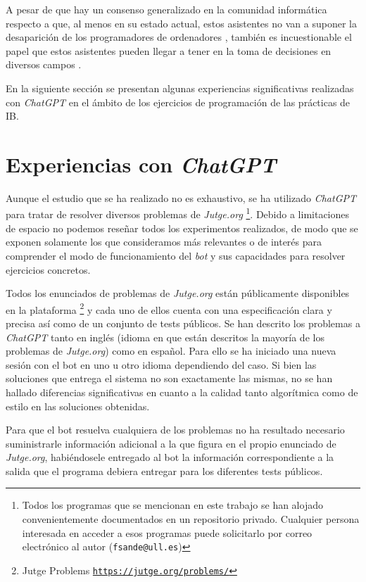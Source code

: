 \documentclass[twocolumn,twoside,a4paper, 10pt]{article}
\newcommand{\jutge}{\textit{Jutge.org}{}}           %
\newcommand{\ChatGPT}{\textit{ChatGPT}{}}           %
\begin{document}
A pesar de que hay un consenso generalizado en la comunidad informática respecto a que, al menos en su estado
actual, estos asistentes no van a suponer la desaparición de los programadores de ordenadores
\cite{Castelvecchi:2022:ACaA}, 
también es incuestionable el papel que estos asistentes pueden llegar a tener en la toma de decisiones en
diversos campos 
\cite{Kung:2022:PCU}.


En la siguiente sección se presentan algunas experiencias significativas realizadas con \ChatGPT{} en el ámbito
de los ejercicios de programación de las prácticas de IB.
\section{Experiencias con \ChatGPT{}}
Aunque el estudio que se ha realizado no es exhaustivo, se ha utilizado \ChatGPT{} para tratar de resolver
diversos problemas de \jutge{}
\footnote{
Todos los programas que se mencionan en este trabajo se han alojado convenientemente documentados en un repositorio privado.
Cualquier persona interesada en acceder a esos programas puede solicitarlo por correo electrónico al autor 
(\texttt{fsande@ull.es})
}. 
Debido a limitaciones de espacio no podemos reseñar todos los experimentos realizados, de modo que 
se exponen solamente los que consideramos más relevantes o de interés para comprender el modo de funcionamiento 
del \textit{bot} y sus capacidades para resolver ejercicios concretos.

Todos los enunciados de problemas de \jutge{} están públicamente disponibles en la plataforma 
\footnote{Jutge Problems \href{https://jutge.org/problems/}{\scriptsize{\texttt{https://jutge.org/problems/}}}}
y cada uno de ellos cuenta con una especificación clara y precisa así como de un conjunto de tests públicos.
Se han descrito los problemas a \ChatGPT{} tanto en inglés (idioma en que están descritos la mayoría de
los problemas de \jutge{}) como en español.
Para ello se ha iniciado una nueva sesión con el bot en uno u otro idioma dependiendo del caso.
Si bien las soluciones que entrega el sistema no son exactamente las mismas, no se han hallado diferencias
significativas en cuanto a la calidad tanto algorítmica como de estilo en las soluciones obtenidas.

Para que el bot resuelva cualquiera de los problemas no ha resultado necesario suministrarle información
adicional a la que figura en el propio enunciado de \jutge{}, habiéndosele entregado al bot la información
correspondiente a la salida que el programa debiera entregar para los diferentes tests públicos.
\end{document}
